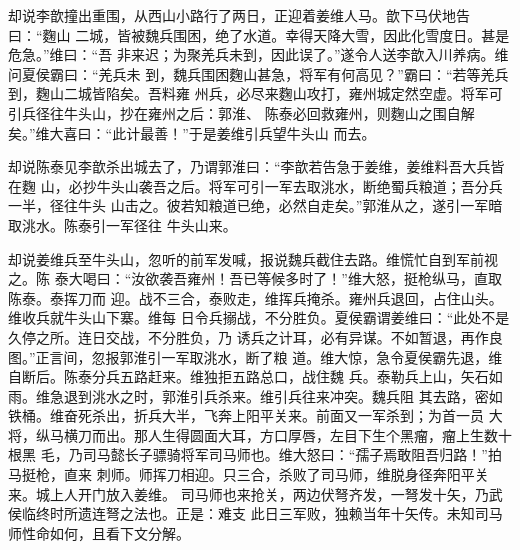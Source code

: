 却说李歆撞出重围，从西山小路行了两日，正迎着姜维人马。歆下马伏地告曰：“麴山
二城，皆被魏兵围困，绝了水道。幸得天降大雪，因此化雪度日。甚是危急。”维曰：“吾
非来迟；为聚羌兵未到，因此误了。”遂令人送李歆入川养病。维问夏侯霸曰：“羌兵未
到，魏兵围困麴山甚急，将军有何高见？”霸曰：“若等羌兵到，麴山二城皆陷矣。吾料雍
州兵，必尽来麴山攻打，雍州城定然空虚。将军可引兵径往牛头山，抄在雍州之后：郭淮、
陈泰必回救雍州，则麴山之围自解矣。”维大喜曰：“此计最善！”于是姜维引兵望牛头山
而去。

却说陈泰见李歆杀出城去了，乃谓郭淮曰：“李歆若告急于姜维，姜维料吾大兵皆在麴
山，必抄牛头山袭吾之后。将军可引一军去取洮水，断绝蜀兵粮道；吾分兵一半，径往牛头
山击之。彼若知粮道已绝，必然自走矣。”郭淮从之，遂引一军暗取洮水。陈泰引一军径往
牛头山来。

却说姜维兵至牛头山，忽听的前军发喊，报说魏兵截住去路。维慌忙自到军前视之。陈
泰大喝曰：“汝欲袭吾雍州！吾已等候多时了！”维大怒，挺枪纵马，直取陈泰。泰挥刀而
迎。战不三合，泰败走，维挥兵掩杀。雍州兵退回，占住山头。维收兵就牛头山下寨。维每
日令兵搦战，不分胜负。夏侯霸谓姜维曰：“此处不是久停之所。连日交战，不分胜负，乃
诱兵之计耳，必有异谋。不如暂退，再作良图。”正言间，忽报郭淮引一军取洮水，断了粮
道。维大惊，急令夏侯霸先退，维自断后。陈泰分兵五路赶来。维独拒五路总口，战住魏
兵。泰勒兵上山，矢石如雨。维急退到洮水之时，郭淮引兵杀来。维引兵往来冲突。魏兵阻
其去路，密如铁桶。维奋死杀出，折兵大半，飞奔上阳平关来。前面又一军杀到；为首一员
大将，纵马横刀而出。那人生得圆面大耳，方口厚唇，左目下生个黑瘤，瘤上生数十根黑
毛，乃司马懿长子骠骑将军司马师也。维大怒曰：“孺子焉敢阻吾归路！”拍马挺枪，直来
刺师。师挥刀相迎。只三合，杀败了司马师，维脱身径奔阳平关来。城上人开门放入姜维。
司马师也来抢关，两边伏弩齐发，一弩发十矢，乃武侯临终时所遗连弩之法也。正是：难支
此日三军败，独赖当年十矢传。未知司马师性命如何，且看下文分解。